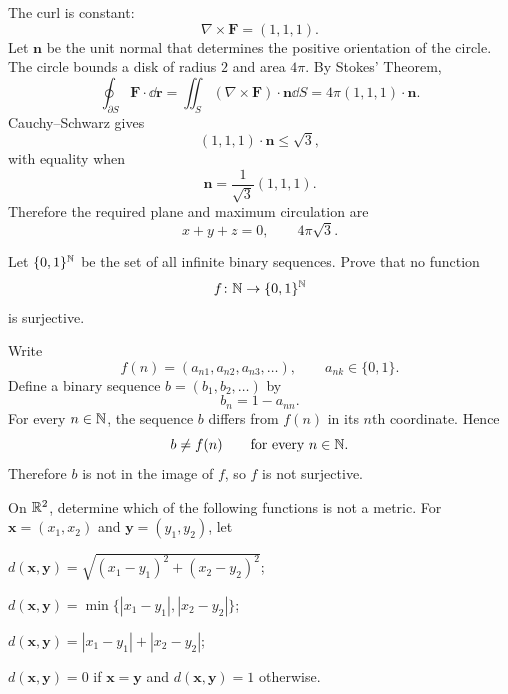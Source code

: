     \begin{solution}
        The curl is constant:
        \[
            \nabla\times\mathbf{F}
            =
            (1,1,1).
        \]
        Let $\mathbf{n}$ be the unit normal that determines the positive
        orientation of the circle. The circle bounds a disk of radius $2$ and
        area $4\pi$. By Stokes' Theorem,
        \[
            \oint_{\partial S}\mathbf{F}\cdot\dd\mathbf{r}
            =
            \iint_S
            (\nabla\times\mathbf{F})\cdot\mathbf{n}\dd S
            =
            4\pi(1,1,1)\cdot\mathbf{n}.
        \]
        Cauchy--Schwarz gives
        \[
            (1,1,1)\cdot\mathbf{n}
            \leq
            \sqrt{3},
        \]
        with equality when
        \[
            \mathbf{n}
            =
            \frac{1}{\sqrt3}(1,1,1).
        \]
        Therefore the required plane and maximum circulation are
        \[
            \boxed{x+y+z=0},
            \qquad
            \boxed{4\pi\sqrt3}.
        \]
    \end{solution}

    \begin{expectedproblem}
        Let $\{0,1\}^{\mathbb{N}}$ be the set of all infinite binary sequences. Prove
        that no function
        \[
            f\colon\mathbb{N}\to\{0,1\}^{\mathbb{N}}
        \]
        is surjective.
    \end{expectedproblem}

    \begin{solution}
        Write
        \[
            f(n)=(a_{n1},a_{n2},a_{n3},\ldots),
            \qquad
            a_{nk}\in\{0,1\}.
        \]
        Define a binary sequence $b=(b_1,b_2,\ldots)$ by
        \[
            b_n=1-a_{nn}.
        \]
        For every $n\in\mathbb{N}$, the sequence $b$ differs from $f(n)$ in its
        $n$th coordinate. Hence
        \[
            b\neq f(n)
            \qquad
            \text{for every }n\in\mathbb{N}.
        \]
        Therefore $b$ is not in the image of $f$, so $f$ is not surjective.
    \end{solution}

    \begin{expectedproblem}
        On $\mathbb{R}^2$, determine which of the following functions is not a metric.
        For $\mathbf{x}=(x_1,x_2)$ and $\mathbf{y}=(y_1,y_2)$, let
        \begin{problemchoices}
            \item $d(\mathbf{x},\mathbf{y})
                  =\sqrt{(x_1-y_1)^2+(x_2-y_2)^2}$;
            \item $d(\mathbf{x},\mathbf{y})
                  =\min\{|x_1-y_1|,|x_2-y_2|\}$;
            \item $d(\mathbf{x},\mathbf{y})
                  =|x_1-y_1|+|x_2-y_2|$;
            \item $d(\mathbf{x},\mathbf{y})=0$ if $\mathbf{x}=\mathbf{y}$ and
                  $d(\mathbf{x},\mathbf{y})=1$ otherwise.
        \end{problemchoices}
    \end{expectedproblem}

